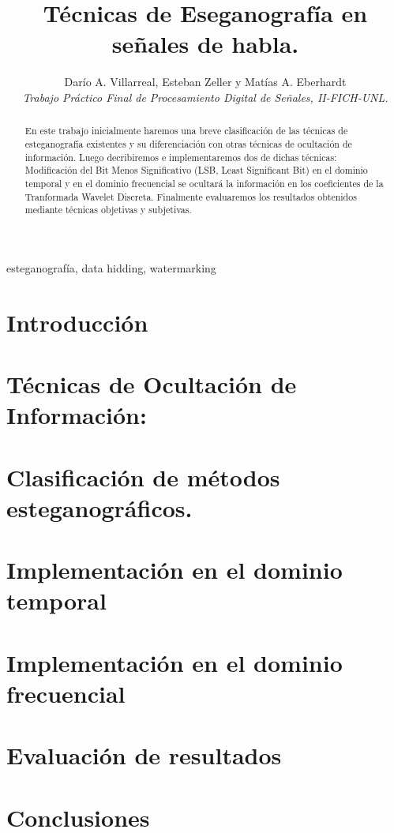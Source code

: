 \documentclass[conference,a4paper,10pt, oneside,final]{tfmpd}
\begin{document}
\title{Técnicas de Eseganografía en señales de habla.}

\author{Darío A. Villarreal,
        Esteban Zeller y
        Matías A. Eberhardt\\
\textit{Trabajo Práctico Final de Procesamiento Digital de Señales, II-FICH-UNL.}}


\maketitle

\begin{abstract}
En este trabajo inicialmente haremos una breve clasificación de las técnicas de esteganografía existentes y su diferenciación con otras técnicas de ocultación de información. Luego decribiremos e implementaremos dos de dichas técnicas: Modificación del Bit Menos Significativo (LSB, Least Significant Bit) en el dominio temporal y en el dominio frecuencial se ocultará la información en los coeficientes de la Tranformada Wavelet Discreta. Finalmente evaluaremos los resultados obtenidos mediante técnicas objetivas y subjetivas.
\end{abstract}

\begin{keywords}
esteganografía, data hidding, watermarking
\end{keywords}

\section{Introducción}


\section{Técnicas de Ocultación de Información:}

\section{Clasificación de métodos esteganográficos.}
\section{Implementación en el dominio temporal}
\section{Implementación en el dominio frecuencial}
\section{Evaluación de resultados}
\section{Conclusiones}

\nocite{*}


\end{document}
